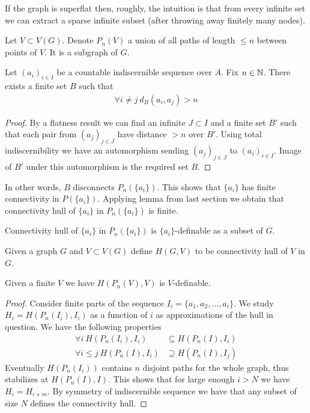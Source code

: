 \documentclass{amsart}
\begin{document}
If the graph is superflat then, roughly, the intuition is that from every infinite set we can extract a sparse infinite subset (after throwing away finitely many nodes).

Let $V \subset V(G)$. Denote $P_n(V)$ a union of all paths of length $\leq n$ between points of $V$. It is a subgraph of $G$.

\begin{Lemma}
	Let $(a_i)_{i \in I}$ be a countable indiscernible sequence over $A$. Fix $n \in \mathbb{N}$. There exists a finite set $B$ such that
	\begin{align*}
		\forall i \neq j \ d_B(a_i, a_j) > n
	\end{align*}
\end{Lemma}

\begin{proof}
	By a flatness result we can find an infinite $J \subset I$ and a finite set $B'$ such that each pair from $(a_j)_{j \in J}$ have distance $>n$ over $B'$. Using total indiscernibility we have an automorphism sending $(a_j)_{j \in J}$ to $(a_i)_{i \in I}$. Image of $B'$ under this automorphism is the required set $B$.
\end{proof}

In other words, $B$ disconnects $P_n(\{a_i\})$. This shows that $\{a_i\}$ has finite connectivity in $P(\{a_i\})$. Applying lemma from last section we obtain that connectivity hull of $\{a_i\}$ in $P_n(\{a_i\})$ is finite.

\begin{Lemma}
	Connectivity hull of $\{a_i\}$ in $P_n(\{a_i\})$ is $\{a_i\}$-definable as a subset of $G$.
\end{Lemma}

\begin{Definition}
	Given a graph $G$ and $V \subset V(G)$ define $H(G, V)$ to be connectivity hull of $V$ in $G$.
\end{Definition}

\begin{Note}
	Given a finite $V$ we have $H(P_n(V), V)$ is $V$-definable.
\end{Note}

\begin{proof}
	Consider finite parts of the sequence $I_i = \{a_1, a_2, \ldots, a_i\}$. We study $H_i = H(P_n(I_i), I_i)$ as a function of $i$ as approximations of the hull in question. We have the following properties
	\begin{align*}
		 \forall i \ H(P_n(I_i), I_i) &\subseteq H(P_n(I), I_i) \\
		 \forall i \leq j \ H(P_n(I), I_i) &\supseteq H(P_n(I), I_j)
	\end{align*}
		Eventually $H(P_n(I_i))$ contains $n$ disjoint paths for the whole graph, thus stabilizes at $H(P_n(I), I)$. This shows that for large enough $i>N$ we have $H_i = H_{i+m}$. By symmetry of indiscernible sequence we have that any subset of size $N$ defines the connectivity hull.
\end{proof}
\end{document}
